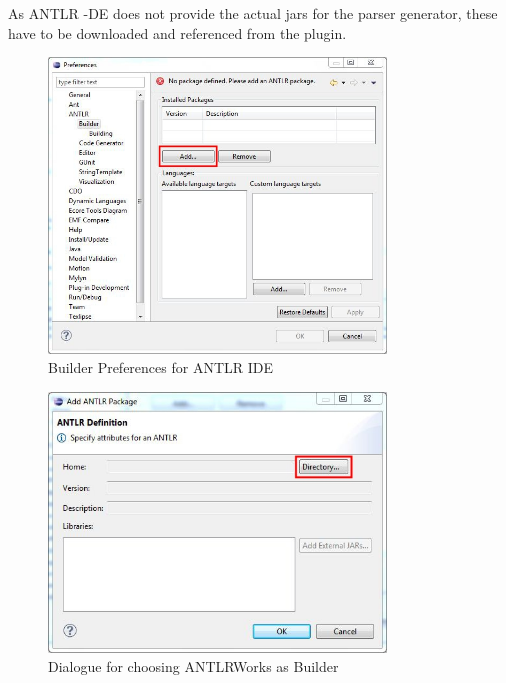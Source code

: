 \begin{enumerate}
As ANTLR -DE does not provide the actual jars for the parser generator, these have to be downloaded and referenced from the plugin.
\begin{figure}[!htbp]
\begin{center}
 \includegraphics[width=0.8\textwidth]{pics/moca/0Install/1-antlr-package}
  \caption{Builder Preferences for ANTLR IDE}
  \label{moca-1-antlr-package}
\end{center}
\end{figure}
\begin{figure}[!htbp]
\begin{center}
 \includegraphics[width=0.8\textwidth]{pics/moca/0Install/2-choose-path-to-jar}
  \caption{Dialogue for choosing ANTLRWorks as Builder}
  \label{moca-2-choose-path-to-jar}
\end{center}
\end{figure}
\end{enumerate}

\clearpage